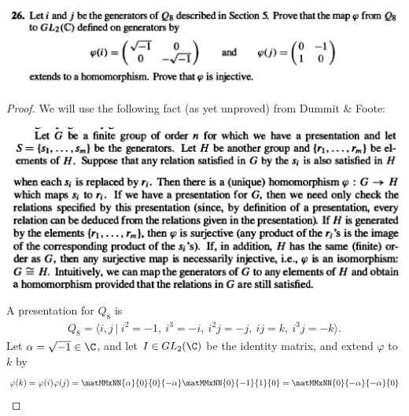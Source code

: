 ~\\~\\
\begin{mdframed}
\includegraphics[width=400pt]{img/abstract-algebra--nf--3-1a71.png}
\end{mdframed}

\begin{proof}
  We will use the following fact (as yet unproved) from Dummit \& Foote:
  \begin{mdframed}
    \includegraphics[width=400pt]{img/abstract-algebra--nf--3-684a.png}\\
    \includegraphics[width=400pt]{img/abstract-algebra--nf--3-2808.png}
  \end{mdframed}

  A presentation for $Q_8$ is
  \begin{align*}
    Q_8 = \big\langle i, j ~\big|~ i^2 = -1, ~ i^3 = -i, ~ i^2j = -j, ~ ij = k, ~ i^3j = -k \big\rangle.
  \end{align*}
  Let $\alpha = \sqrt{-1} \in \C$, and let $I \in GL_2(\C)$ be the identity matrix, and extend
  $\varphi$ to $k$ by
  \begin{align*}
    \varphi(k) &= \varphi(i)\varphi(j) = \matMMxNN{\alpha}{0}
                                 {0}{-\alpha} \matMMxNN{0}{-1}
                                                  {1}{0} = \matMMxNN{0}{-\alpha}
                                                                    {-\alpha}{0} \\
  \end{align*}


\end{proof}
